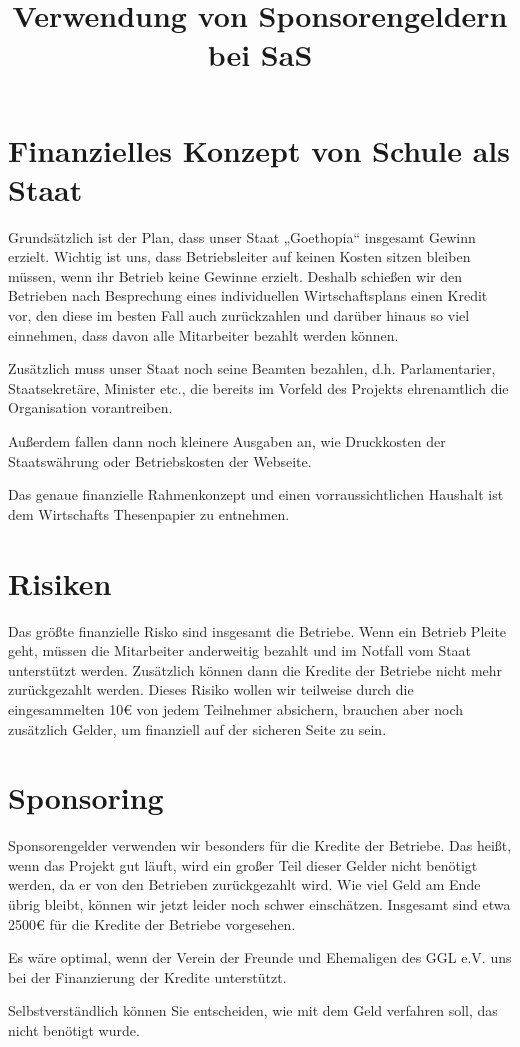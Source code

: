 \documentclass{sasbase}
\begin{document}
\onecolumn
\title{Verwendung von Sponsorengeldern bei SaS}

\mytitle

\setlength{\parindent}{0mm}
\setlength{\parskip}{2mm}

\section{Finanzielles Konzept von Schule als Staat}

Grundsätzlich ist der Plan, dass unser Staat „Goethopia“ insgesamt Gewinn erzielt. Wichtig ist uns,
dass Betriebsleiter auf keinen Kosten sitzen bleiben müssen, wenn ihr Betrieb keine Gewinne erzielt.
Deshalb schießen wir den Betrieben nach Besprechung eines individuellen Wirtschaftsplans
einen Kredit vor, den diese im besten Fall auch zurückzahlen und darüber hinaus so viel einnehmen,
dass davon alle Mitarbeiter bezahlt werden können.

Zusätzlich muss unser Staat noch seine Beamten bezahlen, d.h. Parlamentarier, Staatsekretäre,
Minister etc., die bereits im Vorfeld des Projekts ehrenamtlich die Organisation vorantreiben.

Außerdem fallen dann noch kleinere Ausgaben an, wie Druckkosten der Staatswährung oder
Betriebskosten der Webseite.

Das genaue finanzielle Rahmenkonzept und einen vorraussichtlichen Haushalt ist dem Wirtschafts
Thesenpapier zu entnehmen.

\section{Risiken}

Das größte finanzielle Risko sind insgesamt die Betriebe. Wenn ein Betrieb Pleite geht, müssen die
Mitarbeiter anderweitig bezahlt und im Notfall vom Staat unterstützt werden. Zusätzlich
können dann die Kredite der Betriebe nicht mehr zurückgezahlt werden. Dieses Risiko wollen wir
teilweise durch die eingesammelten 10€ von jedem Teilnehmer absichern, brauchen aber noch zusätzlich
Gelder, um finanziell auf der sicheren Seite zu sein.

\section{Sponsoring}

Sponsorengelder verwenden wir besonders für die Kredite der Betriebe. Das heißt, wenn das Projekt
gut läuft, wird ein großer Teil dieser Gelder nicht benötigt werden, da er von den Betrieben
zurückgezahlt wird. Wie viel Geld am Ende übrig bleibt, können wir jetzt leider noch schwer
einschätzen. Insgesamt sind etwa 2500€ für die Kredite der Betriebe vorgesehen.

Es wäre optimal, wenn der Verein der Freunde und Ehemaligen des GGL e.V. uns bei der Finanzierung
der Kredite unterstützt.

Selbstverständlich können Sie entscheiden, wie mit dem Geld verfahren soll, das nicht benötigt
wurde.
\end{document}
